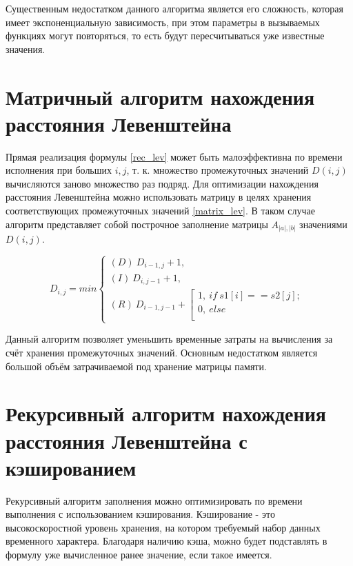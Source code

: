 Существенным недостатком данного алгоритма является его сложность, которая имеет экспоненциальную зависимость, при этом параметры в вызываемых функциях могут повторяться, то есть будут пересчитываться уже известные значения. 
\section{Матричный алгоритм нахождения расстояния Левенштейна}

Прямая реализация формулы \ref{rec_lev} может быть малоэффективна по времени исполнения при больших $i, j$, т. к. множество промежуточных значений $D(i, j)$ вычисляются заново множество раз подряд. Для оптимизации нахождения расстояния Левенштейна можно использовать матрицу в целях хранения соответствующих промежуточных значений \ref{matrix_lev}. В таком случае алгоритм представляет собой построчное заполнение матрицы
$A_{|a|,|b|}$ значениями $D(i, j)$.

\begin{equation}
	\label{matrix_lev}
	D_{i,j} = min
	\begin{cases}
		(D)~D_{i-1,j} + 1, \\
		(I)~D_{i,j-1} + 1, \\
		(R)~D_{i-1,j-1} + 
		\left[
		\begin{gathered}
			1,~if~s1[i] == s2[j]; \\
			0,~else \\
		\end{gathered}
		\right.
	\end{cases}
\end{equation}

Данный алгоритм позволяет уменьшить временные затраты на вычисления за счёт хранения промежуточных значений. Основным недостатком является большой объём затрачиваемой под хранение матрицы памяти.

\section{Рекурсивный алгоритм нахождения расстояния Левенштейна с кэшированием}
\label{sec:recmat}

Рекурсивный алгоритм заполнения можно оптимизировать по времени выполнения с использованием кэширования. Кэширование - это высокоскоростной уровень хранения, на котором требуемый набор данных временного характера. \cite{IBM} Благодаря наличию кэша, можно будет подставлять в формулу уже вычисленное ранее значение, если такое имеется.

